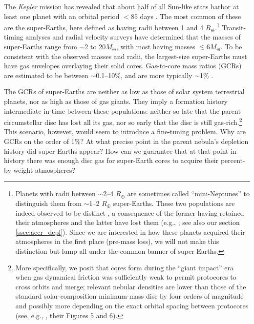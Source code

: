 \documentclass[fleqn,useAMS,usenatbib]{mnras}
\begin{document}
The {\it Kepler} mission has revealed that about half of all Sun-like stars
harbor at least one planet with an orbital period $< 85$ days
\citep{howard10,batalha13,petigura13,dong13,fressin13,rowe14,burke15}. 
The most common of these are the super-Earths, here defined
as having radii between 1 and 4 $R_\oplus$.\footnote{Planets with radii between $\sim$2--4 $R_\oplus$ are sometimes called ``mini-Neptunes'' to distinguish
them from $\sim$1--2 $R_\oplus$ super-Earths.
These two populations are indeed observed to be distinct \citep[e.g.,][]{fulton17},
a consequence of the former having retained their atmospheres
and the latter have lost them (e.g., \citealt{owen13,owen17,ginzburg17}; see also our section \ref{ssec:accr_depl}).
Since we are interested in how these planets acquired their atmospheres
in the first place (pre-mass loss), we will not make this distinction but lump
all under the common banner of super-Earths.} Transit-timing analyses
\citep{wu13} and radial velocity surveys \citep{weiss14} have determined
that the masses of super-Earths range from $\sim$2 to 
20$M_\oplus$, with most having masses $\lesssim 6 M_\oplus$.
To be consistent with the observed masses and radii, 
the largest-size super-Earths
must have gas envelopes overlaying their solid cores.
Gas-to-core mass ratios (GCRs) are estimated to be between
$\sim$0.1--10\%, and are more typically $\sim$1\% \citep{lopez14,wolfgang15}.

The GCRs of super-Earths are neither as low as those of solar system
terrestrial planets, nor as high as those of gas giants.
They imply a formation history intermediate in time
between these populations:
neither so late that the parent 
circumstellar disc has lost all its gas, nor so early that
the disc is still gas-rich.\footnote{
More specifically, we posit that cores form during the ``giant
impact'' era when gas dynamical friction was sufficiently weak to
permit protocores to cross orbits and merge; relevant nebular densities
are lower than those of the standard solar-composition
minimum-mass disc by four orders of magnitude and possibly more
depending on the exact orbital spacing between protocores
(see, e.g., \citealt{paper3}, their Figures 5 and 6).} 
This scenario, however, would seem to introduce a fine-tuning problem.
Why are GCRs on the order of 1\%?
At what precise point in the parent nebula's depletion history did super-Earths
appear? How can we guarantee that at that point 
in history there was enough disc gas 
for super-Earth cores to acquire their percent-by-weight atmospheres?
\end{document}
